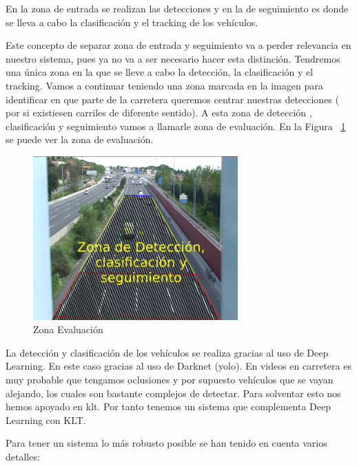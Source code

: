 En la zona de entrada se realizan las detecciones y en la de seguimiento es donde se lleva a cabo la clasificación y el tracking de los vehículos.

Este concepto de separar zona de entrada y seguimiento va a perder relevancia en nuestro sistema, pues ya no va a ser necesario hacer esta distinción. Tendremos una única zona en la que se lleve a cabo la detección, la clasificación y el tracking. Vamos a continuar teniendo una zona marcada en la imagen para identificar en que parte de la carretera queremos centrar nuestras detecciones ( por si existiesen carriles de diferente sentido). A esta zona de detección , clasificación y seguimiento vamos a llamarle zona de evaluación. En la Figura ~\ref{fig.nueva_zona} se puede ver la zona  de evaluación.

\begin{figure}[H] 
\begin{center}
	\includegraphics[width=0.7\textwidth]{figures/Diseno_global/nueva_zona.png}
   \caption{Zona Evaluación}
	\label{fig.nueva_zona}
\end{center}
\end{figure}

La detección y clasificación de los vehículos se realiza gracias al uso de Deep Learning. En este caso gracias al uso de Darknet (\acrshort{yolo}). En videos en carretera es muy probable que tengamos oclusiones y por supuesto vehículos que se vayan alejando, los cuales son bastante complejos de detectar. Para solventar esto nos hemos apoyado en \acrshort{klt}. Por tanto tenemos un sistema que complementa Deep Learning con KLT. 

Para tener un sistema lo más robusto posible se han tenido en cuenta varios detalles:

